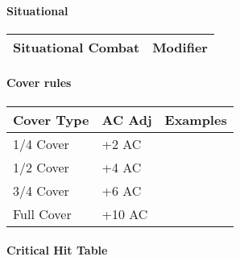 
\paragraph{Situational}
\begin{tabular}{l l}
Situational Combat & Modifier \\
\hline

\end{tabular}

\paragraph{Cover rules} 
\begin{tabular}{l l l }
Cover Type & AC Adj & Examples\\
\hline
1/4 Cover & +2 AC & \\
1/2 Cover & +4 AC & \\
3/4 Cover & +6 AC & \\
Full Cover & +10 AC & \\
\end{tabular}

\paragraph{Critical Hit Table}

